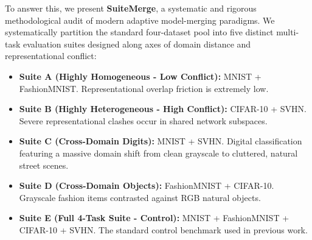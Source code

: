 To answer this, we present \textbf{SuiteMerge}, a systematic and rigorous methodological audit of modern adaptive model-merging paradigms.
We systematically partition the standard four-dataset pool into five distinct multi-task evaluation suites designed along axes of domain distance and representational conflict:
\begin{itemize}
    \item \textbf{Suite A (Highly Homogeneous - Low Conflict):} MNIST + FashionMNIST.
Representational overlap friction is extremely low.
    \item \textbf{Suite B (Highly Heterogeneous - High Conflict):} CIFAR-10 + SVHN.
Severe representational clashes occur in shared network subspaces.
    \item \textbf{Suite C (Cross-Domain Digits):} MNIST + SVHN.
Digital classification featuring a massive domain shift from clean grayscale to cluttered, natural street scenes.
    \item \textbf{Suite D (Cross-Domain Objects):} FashionMNIST + CIFAR-10.
Grayscale fashion items contrasted against RGB natural objects.
    \item \textbf{Suite E (Full 4-Task Suite - Control):} MNIST + FashionMNIST + CIFAR-10 + SVHN.
The standard control benchmark used in previous work.
\end{itemize}

